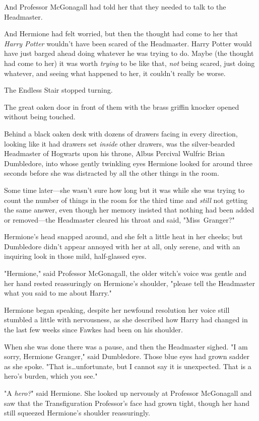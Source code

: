 And Professor McGonagall had told her that they needed to talk to the
Headmaster.

And Hermione had felt worried, but then the thought had come to her that
\emph{Harry Potter} wouldn't have been scared of the Headmaster. Harry Potter
would have just barged ahead doing whatever he was trying to do. Maybe (the
thought had come to her) it was worth \emph{trying} to be like that, \emph{not}
being scared, just doing whatever, and seeing what happened to her, it couldn't
really be worse.

The Endless Stair stopped turning.

The great oaken door in front of them with the brass griffin knocker opened
without being touched.

Behind a black oaken desk with dozens of drawers facing in every direction,
looking like it had drawers set \emph{inside} other drawers, was the
silver-bearded Headmaster of Hogwarts upon his throne, Albus Percival Wulfric
Brian Dumbledore, into whose gently twinkling eyes Hermione looked for around
three seconds before she was distracted by all the other things in the room.

Some time later---she wasn't sure how long but it was while she was trying to
count the number of things in the room for the third time and \emph{still} not
getting the same answer, even though her memory insisted that nothing had been
added or removed---the Headmaster cleared his throat and said, "Miss~Granger?"

Hermione's head snapped around, and she felt a little heat in her cheeks; but
Dumbledore didn't appear annoyed with her at all, only serene, and with an
inquiring look in those mild, half-glassed eyes.

"Hermione," said Professor McGonagall, the older witch's voice was gentle and
her hand rested reassuringly on Hermione's shoulder, "please tell the
Headmaster what you said to me about Harry."

Hermione began speaking, despite her newfound resolution her voice still
stumbled a little with nervousness, as she described how Harry had changed in
the last few weeks since Fawkes had been on his shoulder.

When she was done there was a pause, and then the Headmaster sighed. "I am
sorry, Hermione Granger," said Dumbledore. Those blue eyes had grown sadder as
she spoke. "That is…unfortunate, but I cannot say it is unexpected.
That is a hero's burden, which you see."

"A \emph{hero?}" said Hermione. She looked up nervously at Professor McGonagall
and saw that the Transfiguration Professor's face had grown tight, though her
hand still squeezed Hermione's shoulder reassuringly.

